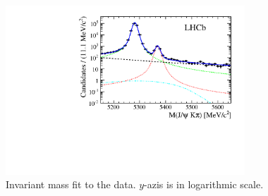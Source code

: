 \begin{figure}[h]
\centering
\includegraphics[width=0.8\textwidth]{Figures/Chapter4/mass_plot_simul_log.pdf}
\caption{Invariant mass fit to the data. $y$-azis is in logarithmic scale.}
\label{mass_plot}
\end{figure}


